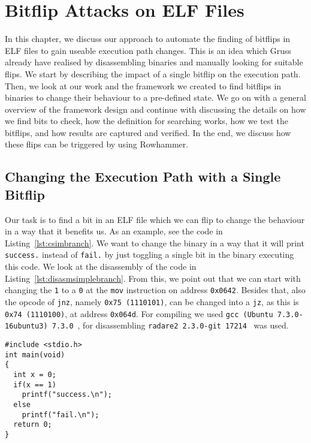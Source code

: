 \chapter{Bitflip Attacks on ELF Files}\label{sec:elfattack}

In this chapter, we discuss our approach to automate the finding of bitflips in
ELF files to gain useable execution path changes. This is an idea which
Gruss~\etal~\cite{flipinthewall} already have realised by disassembling binaries
and manually looking for suitable flips. We start by describing the impact of a
single bitflip on the execution path. Then, we look at our work and the
framework we created to find bitflips in binaries to change their behaviour to a
pre-defined state. We go on with a general overview of the framework design and
continue with discussing the details on how we find bits to check, how the
definition for searching works, how we test the bitflips, and how results are
captured and verified. In the end, we discuss how these flips can be triggered
by using Rowhammer.

\section{Changing the Execution Path with a Single Bitflip}

Our task is to find a bit in an ELF file which we can flip to change the
behaviour in a way that it benefits us. As an example, see the code in
Listing~\ref{lst:csimbranch}. We want to change the binary in a
way that it will print \texttt{success.} instead of \texttt{fail.} by just
toggling a single bit in the binary executing this code. We look at the
disassembly of the code in Listing~\ref{lst:disasmsimplebranch}. From this, we
point out that we can start with changing the \texttt{1} to a \texttt{0} at
the \texttt{mov} instruction on address \texttt{0x0642}. Besides that, also the
opcode of \texttt{jnz}, namely \texttt{0x75 (1110101)}, can be changed into a
\texttt{jz}, as this is \texttt{0x74 (1110100)}, at address \texttt{0x064d}. For
compiling we used \texttt{gcc (Ubuntu 7.3.0-16ubuntu3) 7.3.0}~\cite{gccubuntu},
for disassembling \texttt{radare2 2.3.0-git 17214}~\cite{radare2web} was used.

\begin{minipage}{\linewidth}
\begin{lstlisting}[style=CStyle,
                   caption={Simple branching code to show an example for a
single bitflip to change the execution path.},
                   label={lst:csimbranch}]
#include <stdio.h>
int main(void)
{
  int x = 0;
  if(x == 1)
    printf("success.\n");
  else
    printf("fail.\n");
  return 0;
}
\end{lstlisting}
\end{minipage}

